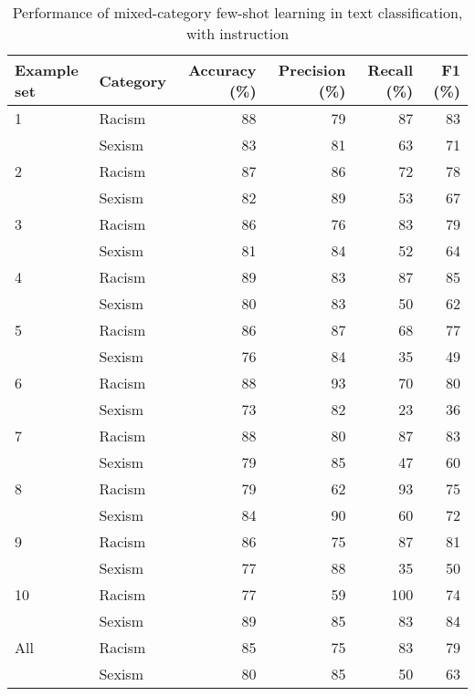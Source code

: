 \documentclass{bmcart}
\begin{document}
\begin{backmatter}
\begin{table}
\caption{\label{tab:fewshotmixedinstructsummary}Performance of mixed-category few-shot learning in text classification, with instruction}
\centering
\begin{tabular}[t]{llrrrr}
\hline
Example set & Category & Accuracy (\%) & Precision (\%) & Recall (\%) & F1 (\%)\\
\hline
1 & Racism & 88 & 79 & 87 & 83\\
 & Sexism & 83 & 81 & 63 & 71\\
\hline
2 & Racism & 87 & 86 & 72 & 78\\
 & Sexism & 82 & 89 & 53 & 67\\
\hline
3 & Racism & 86 & 76 & 83 & 79\\
 & Sexism & 81 & 84 & 52 & 64\\
\hline
4 & Racism & 89 & 83 & 87 & 85\\
 & Sexism & 80 & 83 & 50 & 62\\
\hline
5 & Racism & 86 & 87 & 68 & 77\\
 & Sexism & 76 & 84 & 35 & 49\\
\hline
6 & Racism & 88 & 93 & 70 & 80\\
 & Sexism & 73 & 82 & 23 & 36\\
\hline
7 & Racism & 88 & 80 & 87 & 83\\
 & Sexism & 79 & 85 & 47 & 60\\
\hline
8 & Racism & 79 & 62 & 93 & 75\\
 & Sexism & 84 & 90 & 60 & 72\\
\hline
9 & Racism & 86 & 75 & 87 & 81\\
 & Sexism & 77 & 88 & 35 & 50\\
\hline
10 & Racism & 77 & 59 & 100 & 74\\
 & Sexism & 89 & 85 & 83 & 84\\
\hline
All & Racism & 85 & 75 & 83 & 79\\
 & Sexism & 80 & 85 & 50 & 63\\
\hline
\end{tabular}
\end{table}




\begin{table}


\end{table}
\end{backmatter}
\end{document}
